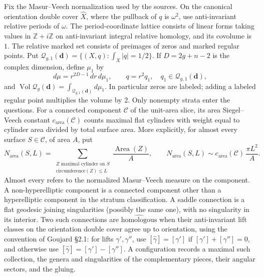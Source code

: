 \documentclass[11pt]{article}
\begin{document}
Fix the Masur--Veech normalization used by the sources. On the canonical orientation double cover $\widehat X$, where the pullback of $q$ is $\omega^2$, use anti-invariant relative periods of $\omega$. The period-coordinate lattice consists of linear forms taking values in $\mathbb Z+i\mathbb Z$ on anti-invariant integral relative homology, and its covolume is $1$. The relative marked set consists of preimages of zeros and marked regular points. Put $\mathcal Q_{g,1}(\boldsymbol d)=\{(X,q):\int_X|q|=1/2\}$. If $D=2g+n-2$ is the complex dimension, define $\mu_1$ by
\[
 d\mu=r^{2D-1}\,dr\,d\mu_1,\qquad q=r^2q_1,\quad q_1\in\mathcal Q_{g,1}(\boldsymbol d),
\]
and $\operatorname{Vol}\mathcal Q_g(\boldsymbol d)=\int_{\mathcal Q_{g,1}(\boldsymbol d)}d\mu_1$. In particular zeros are labeled; adding a labeled regular point multiplies the volume by $2$. Only nonempty strata enter the questions.
For a connected component $\mathcal C$ of the unit-area slice, its area Siegel--Veech constant $c_{\mathrm{area}}(\mathcal C)$ counts maximal flat cylinders with weight equal to cylinder area divided by total surface area. More explicitly, for almost every surface $S\in\mathcal C$, of area $A$, put
\[
N_{\mathrm{area}}(S,L)=\sum_{\substack{Z\text{ maximal cylinder on }S\\\text{circumference}(Z)\le L}}
\frac{\operatorname{Area}(Z)}{A},\qquad
N_{\mathrm{area}}(S,L)\sim c_{\mathrm{area}}(\mathcal C)\,\frac{\pi L^2}{A}.
\]
Almost every refers to the normalized Masur--Veech measure on the component. A non-hyperelliptic component is a connected component other than a hyperelliptic component in the stratum classification.
A saddle connection is a flat geodesic joining singularities (possibly the same one), with no singularity in its interior. Two such connections are $\widehat{\text{homologous}}$ when their anti-invariant lift classes on the orientation double cover agree up to orientation, using the convention of Goujard §2.1: for lifts $\gamma',\gamma''$, use $[\widehat\gamma]=[\gamma']$ if $[\gamma']+[\gamma'']=0$, and otherwise use $[\widehat\gamma]=[\gamma']-[\gamma'']$. A configuration records a maximal such collection, the genera and singularities of the complementary pieces, their angular sectors, and the gluing.
\end{document}
